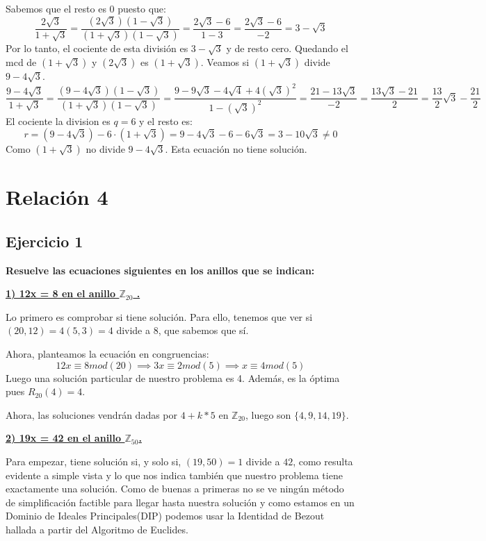 \documentclass[11pt, a4paper, titlepage]{article}
\providecommand{\ent}{\mathbb{Z}}
\begin{document}
Sabemos que el resto es 0 puesto que:\\
$$ \frac{2 \sqrt3}{1 + \sqrt3} = \frac{(2\sqrt3)(1 - \sqrt3)}{(1 + \sqrt3)(1 - \sqrt3)} = \frac{2 \sqrt3 - 6}{1 - 3} = \frac{2\sqrt3 - 6}{-2} = 3 - \sqrt3 $$
Por lo tanto, el cociente de esta división es $ 3 - \sqrt3 $ y de resto cero. Quedando el mcd de $(1 + \sqrt 3)$ y $(2\sqrt3)$ es $(1 + \sqrt 3)$. Veamos si $(1 + \sqrt 3)$ divide $ 9 -4 \sqrt3$.\\
$$ \frac{9 - 4\sqrt3}{1 + \sqrt3} = \frac{(9 - 4\sqrt3)(1 - \sqrt3)}{(1 + \sqrt3)(1 - \sqrt3)} = \frac{9 - 9\sqrt3 - 4\sqrt4 + 4{(\sqrt3)}^{2}}{1 - {(\sqrt3)}^{2} } = \frac{21 -13\sqrt3}{-2} = \frac{13\sqrt3 - 21}{2} = \frac{13}{2}\sqrt3 - \frac{21}{2}$$
El cociente la division es $q = 6$ y el resto es: \\
$$r = (9 -4\sqrt3) - 6 \cdot (1 + \sqrt3) = 9 -4\sqrt3 - 6 -6\sqrt3 = 3 - 10\sqrt{3} \neq 0$$ 
Como $(1 + \sqrt 3)$ no divide $ 9 -4 \sqrt3$. Esta ecuación no tiene solución.




\pagebreak
\section{\Huge{Relación 4}}



\subsection{ \LARGE{Ejercicio 1}}

\textbf{Resuelve las ecuaciones siguientes en los anillos que se indican:}

\underline{\textbf{1) 12x = 8 en el anillo $\ent_{20}$ .}}

Lo primero es comprobar si tiene solución. Para ello, tenemos que ver si $(20,12) = 4(5,3) = 4$ divide a 8, que sabemos que sí.

Ahora, planteamos la ecuación en congruencias:
	\[
	12x \equiv 8 mod(20) \implies 3x \equiv 2 mod(5) \implies x \equiv 4 mod(5)
	\]
Luego una solución particular de nuestro problema es 4. Además, es la óptima pues $R_{20}(4) = 4$.

Ahora, las soluciones vendrán dadas por $4+k*5$ en $\ent_{20}$, luego son $\{4,9,14,19\}$.

\underline{\textbf{2) 19x = 42 en el anillo $\ent_{50}$.}}

Para empezar, tiene solución si, y solo si, $(19,50)=1$ divide a $42$, como resulta evidente a simple vista y lo que nos indica también que nuestro problema tiene exactamente una solución. Como de buenas a primeras no se ve ningún método de simplificación factible para llegar hasta nuestra solución y como estamos en un Dominio de Ideales Principales(DIP) podemos usar la Identidad de Bezout hallada a partir del Algoritmo de Euclides.
\end{document}
